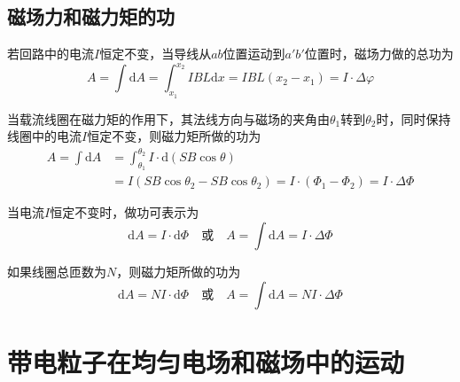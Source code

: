 \documentclass[12pt]{article}
\newcommand{\rmd}{\mathrm{d}}
\begin{document}
\subsection{磁场力和磁力矩的功}

若回路中的电流\(I\)恒定不变，当导线从\(ab\)位置运动到\(a\prime b \prime\)位置时，磁场力做的总功为
\begin{equation}
    A = \int \rmd A = \int_{x_1}^{x_2} IBL \rmd x = IBL (x_2 - x_1) = I \cdot \Delta \varphi
\end{equation}

当载流线圈在磁力矩的作用下，其法线方向与磁场的夹角由\(\theta_1\)转到\(\theta_2\)时，同时保持线圈中的电流\(I\)恒定不变，则磁力矩所做的功为
\begin{equation}
    \begin{aligned}
        A = \int \rmd A & = \int_{\theta_1}^{\theta_2} I \cdot \rmd (SB \cos \theta) \\
        & = I (SB \cos \theta_2 - SB \cos \theta_2) = I \cdot (\Phi_1 - \Phi_2) = I \cdot \Delta \Phi
    \end{aligned}
\end{equation}

当电流\(I\)恒定不变时，做功可表示为
\begin{equation}
    \rmd A = I \cdot \rmd \Phi \quad \text{或} \quad A = \int \rmd A = I \cdot \Delta \Phi
\end{equation}

如果线圈总匝数为\(N\)，则磁力矩所做的功为
\begin{equation}
    \rmd A = NI \cdot \rmd \Phi \quad \text{或} \quad A = \int \rmd A = NI \cdot \Delta \Phi
\end{equation}

\section{带电粒子在均匀电场和磁场中的运动}
\end{document}

